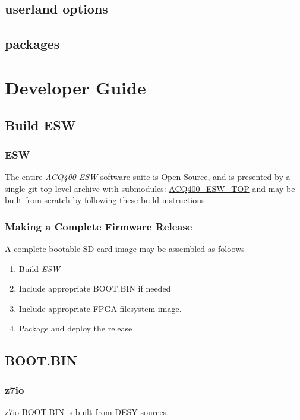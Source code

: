 \documentclass[]{article}
\newcommand{\glossy}[1]{{\color{blue}\itshape #1}}
\begin{document}
\subsection{userland options}

\subsection{packages}

\section{Developer Guide}

\subsection{Build ESW}

\subsubsection{ESW}
The entire \glossy{ACQ400} \glossy{ESW} software suite is Open Source, and is presented by a single git top level archive with submodules:
\href{https://github.com/D-TACQ/ACQ400_ESW_TOP.git}{ACQ400_ESW_TOP}
 and may be built from scratch by following these 
\href{https://github.com/D-TACQ/ACQ400_ESW_TOP/blob/main/README.md}{build instructions}


\subsubsection{Making a Complete Firmware Release}
A complete bootable SD card image may be assembled as foloows
\begin{enumerate}
	\item Build \glossy{ESW}
	\item Include appropriate BOOT.BIN if needed
	\item Include appropriate FPGA filesystem image.
	\item Package and deploy the release
\end{enumerate}


\subsection{BOOT.BIN}

\subsubsection{z7io}
z7io BOOT.BIN is built from DESY sources.
\end{document}
